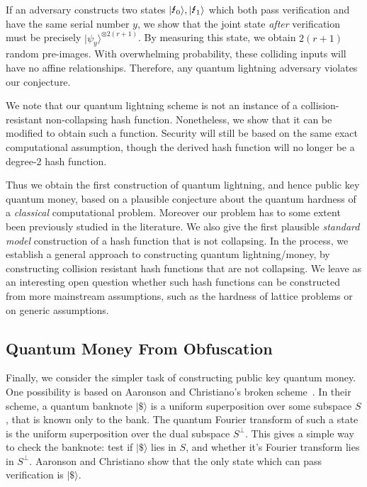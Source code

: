 If an adversary constructs two states $\qlightning[0],\qlightning[1]$ which both pass verification and have the same serial number $y$, we show that the joint state \emph{after} verification must be precisely $|\psi_y\rangle^{\otimes 2(r+1)}$.  By measuring this state, we obtain $2(r+1)$ random pre-images.  With overwhelming probability, these colliding inputs will have no affine relationships.  Therefore, any quantum lightning adversary violates our conjecture.

\medskip

We note that our quantum lightning scheme is not an instance of a collision-resistant non-collapsing hash function.  Nonetheless, we show that it can be modified to obtain such a function.  Security will still be based on the same exact computational assumption, though the derived hash function will no longer be a degree-2 hash function.

Thus we obtain the first construction of quantum lightning, and hence public key quantum money, based on a plausible conjecture about the quantum hardness of a \emph{classical} computational problem.  Moreover our problem has to some extent been previously studied in the literature.  We also give the first plausible \emph{standard model} construction of a hash function that is not collapsing.  In the process, we establish a general approach to constructing quantum lightning/money, by constructing collision resistant hash functions that are not collapsing.  We leave as an interesting open question whether such hash functions can be constructed from more mainstream assumptions, such as the hardness of lattice problems or on generic assumptions.  



\subsection{Quantum Money From Obfuscation}

Finally, we consider the simpler task of constructing public key quantum money.  One possibility is based on Aaronson and Christiano's broken scheme~\cite{STOC:AarChr12}.  In their scheme, a quantum banknote $|\$\rangle$ is a uniform superposition over some subspace $S$, that is known only to the bank.  The quantum Fourier transform of such a state is the uniform superposition over the dual subspace $S^\bot$.  This gives a simple way to check the banknote: test if $|\$\rangle$ lies in $S$, and whether it's Fourier transform lies in $S^\bot$.  Aaronson and Christiano show that the only state which can pass verification is $|\$\rangle$.  

